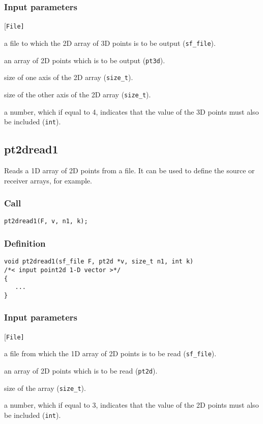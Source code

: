 \subsubsection*{Input parameters}
\begin{desclist}{\tt }{\quad}[\tt File]
   \setlength\itemsep{0pt}
   \item[File] a file to which the 2D array of 3D points is to be output (\texttt{sf\_file}). 
   \item[v]    an array of 2D points which is to be output (\texttt{pt3d}). 
   \item[n1]   size of one axis of the 2D array (\texttt{size\_t}).
   \item[n2]	   size of the other axis of the 2D array (\texttt{size\_t}). 
   \item[k]    a number, which if equal to 4, indicates that the value of the 3D points must also be included (\texttt{int}).     
\end{desclist}




\subsection{{pt2dread1}}
Reads a 1D array of 2D points from a file. It can be used to define the source or receiver arrays, for example.

\subsubsection*{Call}
\begin{verbatim}pt2dread1(F, v, n1, k);\end{verbatim}

\subsubsection*{Definition}
\begin{verbatim}
void pt2dread1(sf_file F, pt2d *v, size_t n1, int k)
/*< input point2d 1-D vector >*/
{
   ...
}
\end{verbatim}

\subsubsection*{Input parameters}
\begin{desclist}{\tt }{\quad}[\tt File]
   \setlength\itemsep{0pt}
   \item[File] a file from which the 1D array of 2D points is to be read (\texttt{sf\_file}). 
   \item[v]    an array of 2D points which is to be read (\texttt{pt2d}). 
   \item[n1]   size of the array (\texttt{size\_t}). 
   \item[k]    a number, which if equal to 3, indicates that the value of the 2D points must also be included (\texttt{int}).     
\end{desclist}




